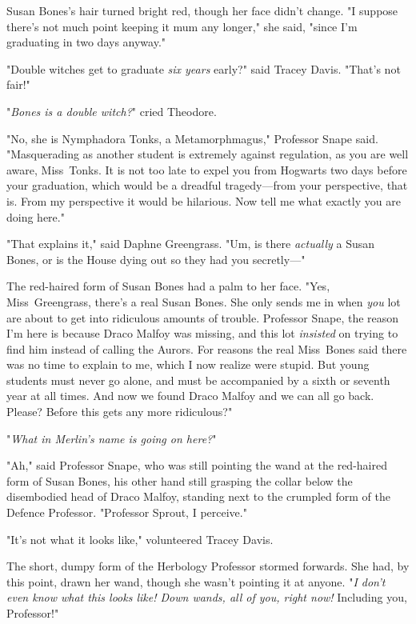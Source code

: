 Susan Bones's hair turned bright red, though her face didn't change. "I suppose
there's not much point keeping it mum any longer," she said, "since I'm
graduating in two days anyway."

"Double witches get to graduate \emph{six years} early?" said Tracey Davis.
"That's not fair!"

"\emph{Bones is a double witch?}" cried Theodore.

"No, she is Nymphadora Tonks, a Metamorphmagus," Professor Snape said.
"Masquerading as another student is extremely against regulation, as you are
well aware, Miss~Tonks. It is not too late to expel you from Hogwarts two days
before your graduation, which would be a dreadful tragedy—from your
perspective, that is. From my perspective it would be hilarious. Now tell me
what exactly you are doing here."

"That explains it," said Daphne Greengrass. "Um, is there \emph{actually} a
Susan Bones, or is the House dying out so they had you secretly—"

The red-haired form of Susan Bones had a palm to her face. "Yes,
Miss~Greengrass, there's a real Susan Bones. She only sends me in when \emph{you}
lot are about to get into ridiculous amounts of trouble. Professor Snape, the
reason I'm here is because Draco Malfoy was missing, and this lot
\emph{insisted} on trying to find him instead of calling the Aurors. For
reasons the real Miss~Bones said there was no time to explain to me, which I
now realize were stupid. But young students must never go alone, and must be
accompanied by a sixth or seventh year at all times. And now we found Draco
Malfoy and we can all go back. Please? Before this gets any more ridiculous?"

"\emph{What in Merlin's name is going on here?}"

"Ah," said Professor Snape, who was still pointing the wand at the red-haired
form of Susan Bones, his other hand still grasping the collar below the
disembodied head of Draco Malfoy, standing next to the crumpled form of the
Defence Professor. "Professor Sprout, I perceive."

"It's not what it looks like," volunteered Tracey Davis.

The short, dumpy form of the Herbology Professor stormed forwards. She had, by
this point, drawn her wand, though she wasn't pointing it at anyone. "\emph{I
don't even know what this looks like! \emph{Down wands, all of you,} right
now!} Including you, Professor!"

